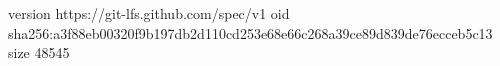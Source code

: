 version https://git-lfs.github.com/spec/v1
oid sha256:a3f88eb00320f9b197db2d110cd253e68e66c268a39ce89d839de76ecceb5c13
size 48545
